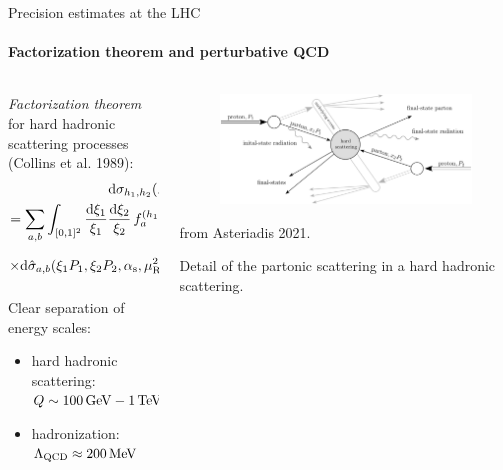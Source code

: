 \begin{frame}{Precision estimates at the LHC}
  \framesubtitle{Factorization theorem and perturbative QCD}

  \begin{columns}

    \begin{column}{0.55 \textwidth}

      \justifying
      \emph{Factorization theorem} for hard hadronic scattering processes (Collins et al. 1989):
      \small
      \begin{multline*}
        \mathrm{d}\sigma_{h_1 , h_2}(P_1 , P_2) \\
        = \sum_{a,b} \int_{[0,1]^2} \frac{\mathrm{d} \xi_1}{\xi_1} \frac{\mathrm{d} \xi_2}{\xi_2} \,f_{a}^{(h_1)}(\xi_1, \mu_\text{F}^2) \,f_{b}^{(h_2)}(\xi_2, \mu_\text{F}^2) \times \\
        \times \mathrm{d}\hat{\sigma}_{a,b}(\xi_1 P_1, \xi_2 P_2, \alpha_\text{s}, \mu_\text{R}^2, \mu_\text{F}^2)
        \left[ 1 + o \left( \frac{\Lambda_\text{QCD}^n}{Q^n} \right) \right]
      \end{multline*}

      Clear separation of energy scales:
      \begin{itemize}
        \item hard hadronic scattering: $ Q \sim 100\,\mathrm{GeV} - 1\,\mathrm{TeV} $
        \item hadronization: $ \Lambda_\text{QCD} \approx 200\,\mathrm{MeV} $
      \end{itemize}

    \end{column}

    \begin{column}{0.45 \textwidth}

      \begin{figure}
        \centering
        \includegraphics[width = \textwidth]{../imgs/part-scatt.png}
      \end{figure}

       from Asteriadis 2021.

      \justifying
      Detail of the partonic scattering in a hard hadronic scattering.

    \end{column}

  \end{columns}

\end{frame}

